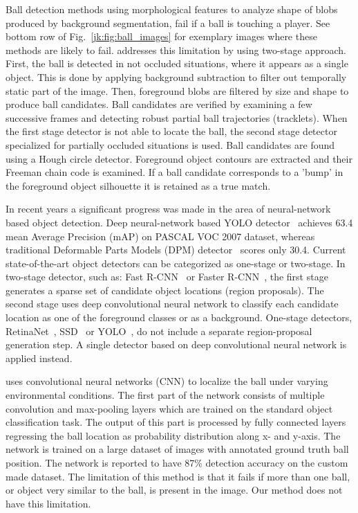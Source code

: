 \documentclass[a4paper,twoside]{article}
\begin{document}
Ball detection methods using morphological features to analyze shape of blobs produced by background segmentation, fail if a ball is touching a player. See bottom row of Fig.~\ref{jk:fig:ball_images} for exemplary images where these methods are likely to fail. 
\cite{Halb15} addresses this limitation by using two-stage approach. First, the ball is detected in not occluded situations, where it appears as a single object. This is done by applying background subtraction to filter out temporally static part of the image. Then, foreground blobs are filtered by size and shape to produce ball candidates. Ball candidates are verified by examining a few successive frames and detecting robust partial ball trajectories (tracklets). When the first stage detector is not able to locate the ball, the second stage detector specialized for partially occluded situations is used.
Ball candidates are found using a Hough circle detector. Foreground object contours are extracted and their Freeman chain code is examined. If a ball candidate corresponds to a 'bump' in the foreground object silhouette it is retained as a true match.




In recent years a significant progress was made in the area of neural-network based object detection. 
Deep neural-network based YOLO detector~\cite{Redm16} achieves 63.4 mean Average Precision (mAP) on PASCAL VOC 2007 dataset, whereas traditional Deformable  Parts  Models (DPM) detector~\cite{Felz10} scores only 30.4. Current state-of-the-art object detectors can be categorized as one-stage or two-stage. In two-stage detector, such as: Fast R-CNN~\cite{Girs15} or Faster R-CNN~\cite{Ren15},
the first stage generates a sparse set of candidate object locations (region proposals). The second stage uses deep convolutional neural network to classify each candidate location as one of the foreground classes or as a background. One-stage detectors, RetinaNet~\cite{Lin17}, SSD~\cite{Liu16} or YOLO~\cite{Redm16}, do not include a separate region-proposal generation step. A single detector based on deep convolutional neural network is applied instead. 

\cite{Spec17} uses convolutional neural networks (CNN) to localize the ball under varying environmental conditions. The first part of the network consists of multiple convolution and max-pooling layers which are trained on the standard object classification task. The output of this part is processed by fully connected layers regressing the ball location as probability distribution along x- and y-axis. The network is trained on a large dataset of images with annotated ground truth ball position. The network is reported to have 87\% detection accuracy on the custom made dataset. The limitation of this method is that it fails if more than one ball, or object very similar to the ball, is present in the image. Our method does not have this limitation.
\end{document}
